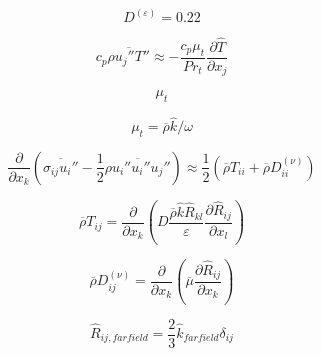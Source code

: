 {\newpage\clearpage
{}%
\begin{displaymath}
D^{(\varepsilon)} = 0.22
\end{displaymath}%
\lthtmldisplayZ
\lthtmlcheckvsize\clearpage}

{\newpage\clearpage
{}%
\begin{displaymath}
c_p \overline {\rho u_j'' T''} \approx
-\frac{c_p \mu_t}{Pr_t} \frac{\partial \hat T}{\partial x_j}
\end{displaymath}%
\lthtmldisplayZ
\lthtmlcheckvsize\clearpage}

{\newpage\clearpage
{}%
\begin{displaymath}
\mu_t
\end{displaymath}%
\lthtmldisplayZ
\lthtmlcheckvsize\clearpage}

{\newpage\clearpage
{}%
\begin{displaymath}
\mu_t=\overline \rho \hat k / \omega
\end{displaymath}%
\lthtmldisplayZ
\lthtmlcheckvsize\clearpage}

{\newpage\clearpage
{}%
\begin{displaymath}
\frac{\partial}{\partial x_k} \left(
\overline{\sigma_{ij} u_i''} - \frac{1}{2} \overline{\rho u_i'' u_i'' u_j''} \right) \approx
\frac{1}{2} \left( \overline \rho T_{ii} + \overline \rho D_{ii}^{(\nu)} \right)
\end{displaymath}%
\lthtmldisplayZ
\lthtmlcheckvsize\clearpage}

{\newpage\clearpage
{}%
\begin{displaymath}
\overline \rho T_{ij} = \frac{\partial}{\partial x_k} \left(
D \frac{\overline \rho \hat k \hat R_{kl}}{\varepsilon}
\frac{\partial \hat R_{ij}}{\partial x_l} \right)
\end{displaymath}%
\lthtmldisplayZ
\lthtmlcheckvsize\clearpage}

{\newpage\clearpage
{}%
\begin{displaymath}
\overline \rho D_{ij}^{(\nu)} = \frac{\partial}{\partial x_k} \left(
\overline \mu \frac{\partial \hat R_{ij}}{\partial x_k} \right)
\end{displaymath}%
\lthtmldisplayZ
\lthtmlcheckvsize\clearpage}

{\newpage\clearpage
{}%
\begin{displaymath}
\hat R_{ij, farfield} = \frac{2}{3} \hat k_{farfield} \delta_{ij}
\end{displaymath}%
\lthtmldisplayZ
\lthtmlcheckvsize\clearpage}


